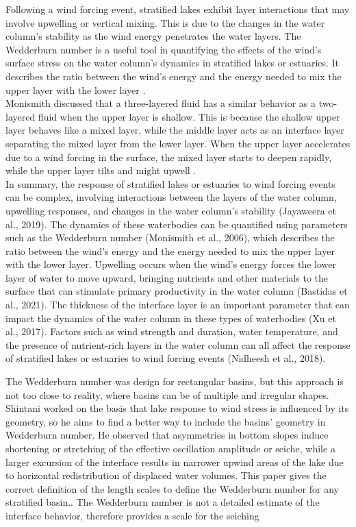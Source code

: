 \documentclass[tesis.tex]{subfiles}
\begin{document}
Following a wind forcing event, stratified lakes exhibit layer interactions that may involve upwelling or vertical mixing. This is due to the changes in the water column's stability as the wind energy penetrates the water layers. The Wedderburn number is a useful tool in quantifying the effects of the wind's surface stress on the water column's dynamics in stratified lakes or estuaries. It describes the ratio between the wind's energy and the energy needed to mix the upper layer with the lower layer \citep{jenkins1984response}.\\

Monismith discussed that a three-layered fluid has a similar behavior as a two-layered fluid when the upper layer is shallow. This is because the shallow upper layer behaves like a mixed layer, while the middle layer acts as an interface layer separating the mixed layer from the lower layer. When the upper layer accelerates due to a wind forcing in the surface, the mixed layer starts to deepen rapidly, while the upper layer tilts and might upwell \citep{monismith2006vertical}.\\

In summary, the response of stratified lakes or estuaries to wind forcing events can be complex, involving interactions between the layers of the water column, upwelling responses, and changes in the water column's stability (Jayaweera et al., 2019). The dynamics of these waterbodies can be quantified using parameters such as the Wedderburn number (Monismith et al., 2006), which describes the ratio between the wind's energy and the energy needed to mix the upper layer with the lower layer. Upwelling occurs when the wind's energy forces the lower layer of water to move upward, bringing nutrients and other materials to the surface that can stimulate primary productivity in the water column (Bastidas et al., 2021). The thickness of the interface layer is an important parameter that can impact the dynamics of the water column in these types of waterbodies (Xu et al., 2017). Factors such as wind strength and duration, water temperature, and the presence of nutrient-rich layers in the water column can all affect the response of stratified lakes or estuaries to wind forcing events (Nidheesh et al., 2018).


The Wedderburn number was design for rectangular basins, but this approach is not too close to reality, where basins can be of multiple and irregular shapes. Shintani worked on the basis that lake response to wind stress is influenced by its geometry, so he aims to find a better way to include the basins' geometry in Wedderburn number. He observed that asymmetries in bottom slopes induce shortening or stretching of the effective oscillation amplitude or seiche, while a larger excursion of the interface results in narrower
upwind areas of the lake due to horizontal redistribution of displaced water volumes. This paper gives the correct
definition of the length scales to define the Wedderburn number for any stratified basin.. The Wedderburn number is not a detailed estimate of the interface behavior, therefore provides a scale for the seiching
\end{document}

